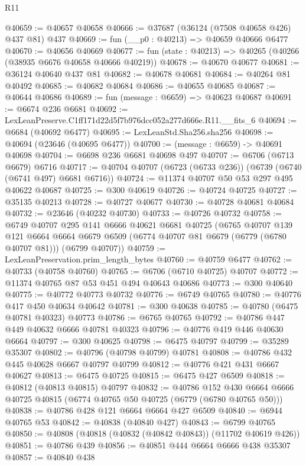 \begin{lexlean}{R11}
\begin{coremodule}
@40659 := @40657 @40658
@40666 := @37687 (@36124 (@7508 @40658 @426) @437 @81) @437
@40669 := fun (__p0 : @40213) => @40659 @40666 @6477
@40670 := @40656 @40669
@40677 := fun (state : @40213) => @40265 (@40266 (@38935 @6676 @40658 @40666 @40219))
@40678 := @40670 @40677
@40681 := @36124 @40640 @437 @81
@40682 := @40678 @40681
@40684 := @40264 @81 @40492
@40685 := @40682 @40684
@40686 := @40655 @40685
@40687 := @40644 @40686
@40689 := fun (message : @6659) => @40623 @40687
@40691 := @6674 @236 @6681
@40692 := LexLeanPreserve.C1ff171d22d5f7b976dcc052a277d666e.R11.__fits_6
@40694 := @6684 (@40692 @6477)
@40695 := LexLeanStd.Sha256.sha256
@40698 := @40694 (@23646 (@40695 @6477))
@40700 := (message : @6659) -> @40691 @40698
@40704 := @6698 @236 @6681 @40698 @497
@40707 := @6706 (@6713 @6679) @6716
@40717 := @40704 @40707 (@6723 (@6733 @236)) (@6739 (@6740 (@6741 @497) @6681 @6716))
@40724 := @11374 @40707 @50 @53 @297 @495 @40622 @40687
@40725 := @300 @40619
@40726 := @40724 @40725
@40727 := @35135 @40213
@40728 := @40727 @40677
@40730 := @40728 @40681 @40684
@40732 := @23646 (@40232 @40730)
@40733 := @40726 @40732
@40758 := @6749
    @40707
    @295
    @141
    @6666
    @40621
    @6681
    @40725
    (@6765
      @40707
      @139
      @121
      @6664
      @6664
      @6679
      @6509
      (@6774 @40707 @81 @6679 (@6779 (@6780 @40707 @81)))
      (@6799 @40707))
@40759 := LexLeanPreservation.prim_length_bytes
@40760 := @40759 @6477
@40762 := @40733 (@40758 @40760)
@40765 := @6706 (@6710 @40725) @40707
@40772 := @11374 @40765 @87 @53 @451 @494 @40643 @40686
@40773 := @300 @40640
@40775 := @40772 @40773 @40732
@40776 := @6749 @40765
@40780 := @40776 @417 @450 @40634 @40642
@40781 := @300 @40638
@40785 := @40780 (@6475 @40781 @40323) @40773
@40786 := @6765 @40765
@40792 := @40786 @447 @449 @40632 @6666 @40781 @40323
@40796 := @40776 @419 @446 @40630 @6664
@40797 := @300 @40625
@40798 := @6475 @40797
@40799 := @35289 @35307
@40802 := @40796 (@40798 @40799) @40781
@40808 := @40786 @432 @445 @40628 @6667 @40797 @40799
@40812 := @40776 @421 @431 @6667 @40627
@40813 := @6475 @40725
@40815 := @6475 @427 @6509
@40818 := @40812 (@40813 @40815) @40797
@40832 := @40786
    @152
    @430
    @6664
    @6666
    @40725
    @40815
    (@6774 @40765 @50 @40725 (@6779 (@6780 @40765 @50)))
@40838 := @40786 @428 @121 @6664 @6664 @427 @6509
@40840 := @6944 @40765 @53
@40842 := @40838 (@40840 @427)
@40843 := @6799 @40765
@40850 := @40808 (@40818 (@40832 (@40842 @40843)) (@11702 @40619 @426))
@40851 := @40786 @439
@40856 := @40851 @444 @6664 @6666 @438 @35307
@40857 := @40840 @438

\end{coremodule}
\end{lexlean}
